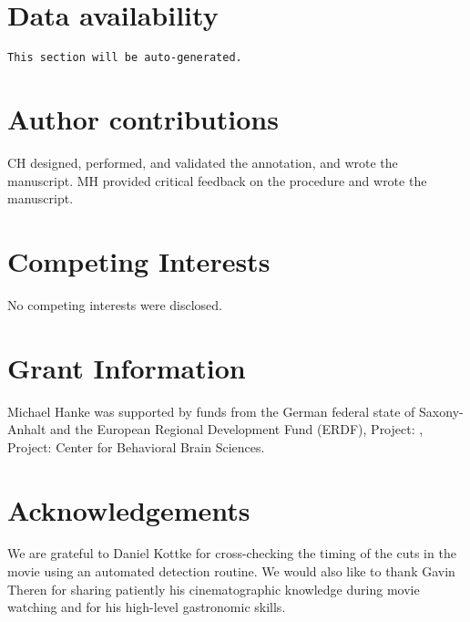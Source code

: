 \documentclass[10pt,a4paper]{article}
\begin{document}
\begin{multicols}{2}
\section*{Data availability}

\texttt{This section will be auto-generated.}


\section*{Author contributions}
CH designed, performed, and validated the annotation, and wrote the manuscript.
MH provided critical feedback on the procedure and wrote the manuscript.

\section*{Competing Interests}
No competing interests were disclosed.

\section*{Grant Information}

Michael Hanke was supported by funds from the German federal state of
Saxony-Anhalt and the European Regional Development Fund (ERDF), Project: ,
Project: Center for Behavioral Brain Sciences.

\section*{Acknowledgements}
We are grateful to Daniel Kottke for cross-checking the timing of the cuts in
the movie using an automated detection routine. We would also like to thank Gavin
Theren for sharing patiently his cinematographic knowledge 
during movie watching and for his high-level gastronomic skills.

{\small
}

\end{multicols}
\end{document}
